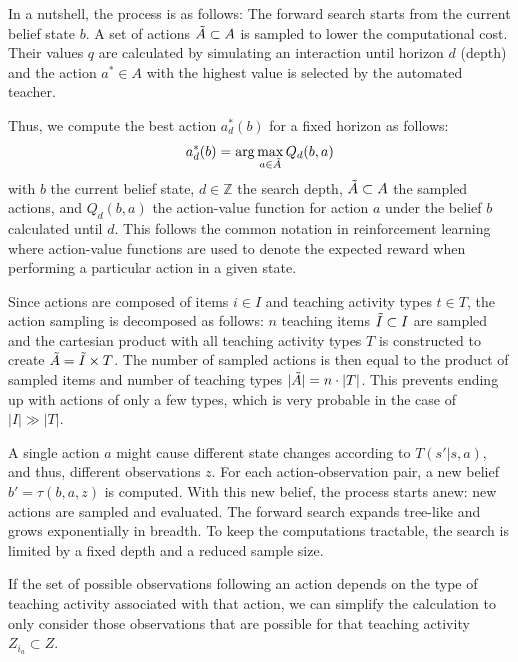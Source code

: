 In a nutshell, the process is as follows:
The forward search starts from the current belief state $b$. 
A set of actions $\Tilde{A} \subset A$ is sampled to lower the computational cost.
Their values $q$ are calculated by simulating an interaction until horizon $d$ (depth) and the action $a^* \in A$ with the highest value is selected by the automated teacher.

Thus, we compute the best action $a^*_d(b)$ for a fixed horizon as follows:
\begin{equation}
    a^*_d(b) = \arg \max_{a \in \Tilde{A}} Q_d(b, a)
    \label{eq:best-action}
\end{equation}
with $b$ the current belief state, $d \in \mathbb{Z}$ the search depth, $\Tilde{A} \subset A$ the sampled actions, and $Q_d(b, a)$ the action-value function for action $a$ under the belief $b$ calculated until $d$. This follows the common notation in reinforcement learning where action-value functions are used to denote the expected reward when performing a particular action in a given state.


Since actions are composed of items $i \in I$ and teaching activity types $t \in T$, the action sampling is decomposed as follows:
$n$ teaching items $\Tilde{I} \subset I$ are sampled and the cartesian product with all teaching activity types $T$ is constructed to create $\Tilde{A} = \Tilde{I} \times T$.
The number of sampled actions is then equal to the product of sampled items and number of teaching types $|\Tilde{A}| = n \cdot |T|$.
This prevents ending up with actions of only a few types, which is very probable in the case of $|I| \gg |T|$.

A single action $a$ might cause different state changes according to $T(s'|s,a)$, and thus, different observations $z$.
For each action-observation pair, a new belief $b'=\tau(b,a,z)$ is computed.
With this new belief, the process starts anew: new actions are sampled and evaluated.
The forward search expands tree-like and grows exponentially in breadth.
To keep the computations tractable, the search is limited by a fixed depth and a reduced sample size.

If the set of possible observations following an action depends on the type of teaching activity associated with that action, we can simplify the calculation to only consider those observations that are possible for that teaching activity $Z_{i_a} \subset Z$.

